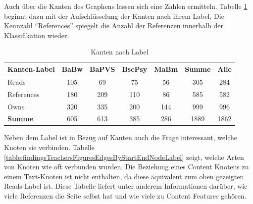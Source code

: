     Auch über die Kanten des Graphens lassen sich eine Zahlen ermitteln.
    Tabelle \ref{table:findingTeachersFiguresEdgesByLabel} beginnt dazu
    mit der Aufschlüsselung der Kanten nach ihrem Label.
    Die Kennzahl "`References"' spiegelt die Anzahl der Referenzen innerhalb der Klassifikation wieder.

    \begin{table}[htb]
        \centering
        \begin{tabular}{|l|c|c|c|c|c|c|}
            \hline
            \multicolumn{1}{|c|}{\textbf{Kanten-Label}} & \textbf{BaBw} & \textbf{BaPVS} & \textbf{BscPsy} & \textbf{MaBm} & \textbf{Summe} & \textbf{Alle} \\ \hline
            Reads                                       & 105           & 69             & 75              & 56            & 305            & 284           \\ \hline
            References                                  & 180           & 209            & 110             & 86            & 585            & 582           \\ \hline
            Owns                                        & 320           & 335            & 200             & 144           & 999            & 996           \\ \hline
            \hline
            \textbf{Summe}                              & 605           & 613            & 385             & 286           & 1889           & 1862          \\ \hline
        \end{tabular}
        \caption{Kanten nach Label}
        \label{table:findingTeachersFiguresEdgesByLabel}
    \end{table}

    Neben dem Label ist in Bezug auf Kanten auch die Frage interessant,
    welche Knoten sie verbinden.
    Tabelle \ref{table:findingsTeachersFiguresEdgesByStartEndNodeLabel}
    zeigt, welche Arten von Knoten wie oft verbunden wurden.
    Die Beziehung eines Content Knotens zu einem Text-Knoten ist nicht enthalten,
    da diese äquivalent zum oben gezeigten Reads-Label ist.
    Diese Tabelle liefert unter anderem Informationen darüber,
    wie viele Referenzen die Seite selbst hat und wie viele zu Content Features gehören.

